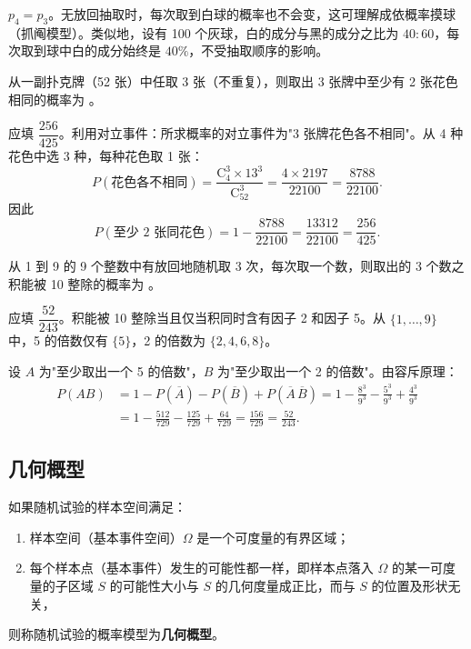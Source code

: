 \documentclass[lang=cn,11pt]{elegantbook}
\begin{document}
\begin{note}
\(p_4 = p_3\)。无放回抽取时，每次取到白球的概率也不会变，这可理解成依概率摸球（抓阄模型）。类似地，设有 100 个灰球，白的成分与黑的成分之比为 \(40:60\)，每次取到球中白的成分始终是 \(40\%\)，不受抽取顺序的影响。
\end{note}

\begin{exercise}\label{exer:1-26}
从一副扑克牌（52 张）中任取 3 张（不重复），则取出 3 张牌中至少有 2 张花色相同的概率为 \underline{\hspace{2cm}}。
\end{exercise}

\begin{solution}
应填 \(\dfrac{256}{425}\)。利用对立事件：所求概率的对立事件为"3 张牌花色各不相同"。从 4 种花色中选 3 种，每种花色取 1 张：
\[P(\text{花色各不相同}) = \frac{\mathrm{C}_4^3 \times 13^3}{\mathrm{C}_{52}^3} = \frac{4 \times 2197}{22100} = \frac{8788}{22100}.\]
因此
\[P(\text{至少 2 张同花色}) = 1 - \frac{8788}{22100} = \frac{13312}{22100} = \frac{256}{425}.\]
\end{solution}


\begin{exercise}[提高]\label{exer:1-51}
从 1 到 9 的 9 个整数中有放回地随机取 3 次，每次取一个数，则取出的 3 个数之积能被 10 整除的概率为 \underline{\hspace{2cm}}。
\end{exercise}

\begin{solution}
应填 \(\dfrac{52}{243}\)。积能被 10 整除当且仅当积同时含有因子 2 和因子 5。从 \(\{1,\dots,9\}\) 中，5 的倍数仅有 \(\{5\}\)，2 的倍数为 \(\{2,4,6,8\}\)。

设 \(A\) 为"至少取出一个 5 的倍数"，\(B\) 为"至少取出一个 2 的倍数"。由容斥原理：
\begin{align*}
P(AB) &= 1 - P(\overline{A}) - P(\overline{B}) + P(\overline{A}\,\overline{B}) = 1 - \frac{8^3}{9^3} - \frac{5^3}{9^3} + \frac{4^3}{9^3} \\
&= 1 - \frac{512}{729} - \frac{125}{729} + \frac{64}{729} = \frac{156}{729} = \frac{52}{243}.
\end{align*}
\end{solution}


\subsection{几何概型}

\begin{definition}[几何概型] \label{def:geometric-prob}
如果随机试验的样本空间满足：
\begin{enumerate}
    \item 样本空间（基本事件空间）\(\Omega\) 是一个可度量的有界区域；
    \item 每个样本点（基本事件）发生的可能性都一样，即样本点落入 \(\Omega\) 的某一可度量的子区域 \(S\) 的可能性大小与 \(S\) 的几何度量成正比，而与 \(S\) 的位置及形状无关，
\end{enumerate}
则称随机试验的概率模型为\textbf{几何概型}。
\end{definition}
\end{document}
